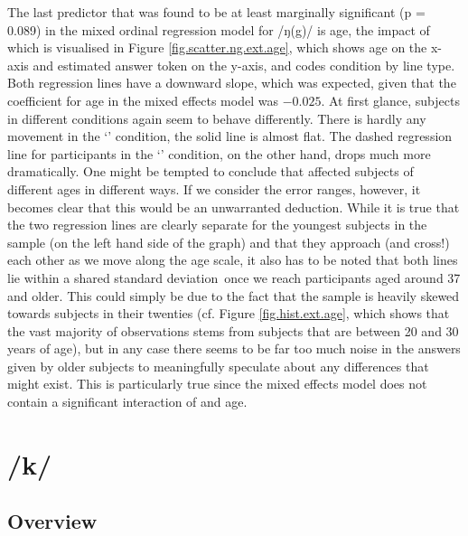 The last predictor that was found to be at least marginally significant (p = 0.089) in the mixed ordinal regression model for /ŋ(g)/ is age, the impact of which is visualised in Figure \ref{fig.scatter.ng.ext.age}, which shows age on the x-axis and estimated answer token on the y-axis, and codes  condition by line type.
Both regression lines have a downward slope, which was expected, given that the coefficient for age in the mixed effects model was \ensuremath{-0.025}.
At first glance, subjects in different  conditions again seem to behave differently.
There is hardly any movement in the `' condition, the solid line is almost flat.
The dashed regression line for participants in the `' condition, on the other hand, drops much more dramatically.
One might be tempted to conclude that  affected subjects of different ages in different ways.
If we consider the error ranges, however, it becomes clear that this would be an unwarranted deduction.
While it is true that the two regression lines are clearly separate for the youngest subjects in the sample (on the left hand side of the graph) and that they approach (and cross!) each other as we move along the age scale, it also has to be noted that both lines lie within a shared standard deviation\ once we reach participants aged around 37 and older.
This could simply be due to the fact that the sample is heavily skewed towards subjects in their twenties (cf. Figure \ref{fig.hist.ext.age}, which shows that the vast majority of observations stems from subjects that are between 20 and 30 years of age), but in any case there seems to be far too much noise in the answers given by older subjects to meaningfully speculate about any differences that might exist.
This is particularly true since the mixed effects model does not contain a significant interaction of  and age.

\section{/k/}
\label{sec.perc_res.k}
	\subsection{Overview}
	\label{sec.perc_res.k.overview}

